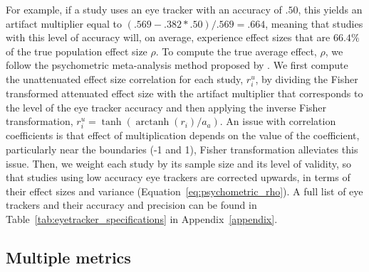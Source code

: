 \documentclass[english,natbib,man,floatsintext]{apa6}
\DeclareMathOperator\arctanh{arctanh}
\begin{document}
For example, if a study uses an eye tracker with an accuracy of $.50$, this yields an artifact multiplier equal to $(.569 - .382*.50)/.569 = .664$, meaning that studies with this level of accuracy will, on average, experience effect sizes that are $66.4\%$ of the true population effect size $\rho$. To compute the true average effect, $\rho$, we follow the psychometric meta-analysis method proposed by \cite{hunter2004a}. We first compute the unattenuated effect size correlation for each study, $r_i^u$, by dividing the Fisher transformed attenuated effect size with the artifact multiplier that corresponds to the level of the eye tracker accuracy and then applying the inverse Fisher transformation, $r_i^u = \tanh(\arctanh(r_i)/a_a)$. An issue with correlation coefficients is that effect of multiplication depends on the value of the coefficient, particularly near the boundaries (-1 and 1), Fisher transformation alleviates this issue. Then, we weight each study by its sample size and its level of validity, so that studies using low accuracy eye trackers are corrected upwards, in terms of their effect sizes and variance (Equation~\ref{eq:psychometric_rho}). A full list of eye trackers and their accuracy and precision can be found in Table~\ref{tab:eyetracker_specifications} in Appendix~\ref{appendix}.


\subsection{Multiple metrics}
\end{document}
